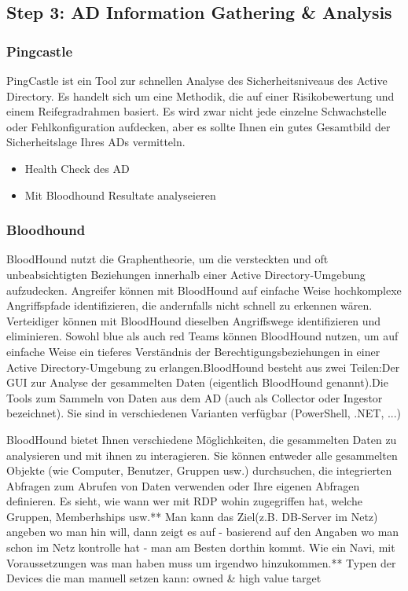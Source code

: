 \subsection{Step 3: AD Information Gathering \& Analysis}

\subsubsection{Pingcastle}
PingCastle ist ein Tool zur schnellen Analyse des Sicherheitsniveaus des Active Directory. Es handelt sich um eine Methodik, die auf einer Risikobewertung und einem Reifegradrahmen basiert. Es wird zwar nicht jede einzelne Schwachstelle oder Fehlkonfiguration aufdecken, aber es sollte Ihnen ein gutes Gesamtbild der Sicherheitslage Ihres ADs vermitteln.
\begin{itemize}
    \item Health Check des AD
    \item Mit Bloodhound Resultate analyseieren
\end{itemize}

\subsubsection{Bloodhound}
BloodHound nutzt die Graphentheorie, um die versteckten und oft unbeabsichtigten Beziehungen innerhalb einer Active Directory-Umgebung aufzudecken. Angreifer können mit BloodHound auf einfache Weise hochkomplexe Angriffspfade identifizieren, die andernfalls nicht schnell zu erkennen wären. Verteidiger können mit BloodHound dieselben Angriffswege identifizieren und eliminieren. Sowohl blue als auch red Teams können BloodHound nutzen, um auf einfache Weise ein tieferes Verständnis der Berechtigungsbeziehungen in einer Active Directory-Umgebung zu erlangen.BloodHound besteht aus zwei Teilen:Der GUI zur Analyse der gesammelten Daten (eigentlich BloodHound genannt).Die Tools zum Sammeln von Daten aus dem AD (auch als Collector oder Ingestor bezeichnet). Sie sind in verschiedenen Varianten verfügbar (PowerShell, .NET, ...)

BloodHound bietet Ihnen verschiedene Möglichkeiten, die gesammelten Daten zu analysieren und mit ihnen zu interagieren. Sie können entweder alle gesammelten Objekte (wie Computer, Benutzer, Gruppen usw.) durchsuchen, die integrierten Abfragen zum Abrufen von Daten verwenden oder Ihre eigenen Abfragen definieren. Es sieht, wie wann wer mit RDP wohin zugegriffen hat, welche Gruppen, Memberhships usw.** Man kann das Ziel(z.B. DB-Server im Netz) angeben wo man hin will, dann zeigt es auf - basierend auf den Angaben wo man schon im Netz kontrolle hat - man am Besten dorthin kommt. Wie ein Navi, mit Voraussetzungen was man haben muss um irgendwo hinzukommen.** Typen der Devices die man manuell setzen kann: owned \& high value target

